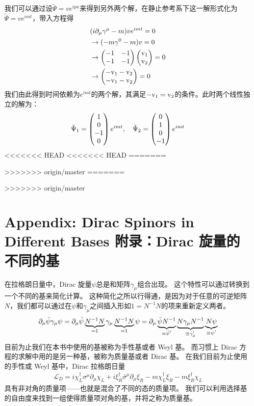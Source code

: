 我们可以通过设$\tilde \Psi =ve^{ipx}$来得到另外两个解，在静止参考系下这一解形式化为$\tilde \Psi=ve^{imt}$，带入方程得
\begin{equation}
\begin{split}
&(i\partial_\mu\gamma^\mu-m)ve^{imt}=0\\
&\to (-m\gamma^0-m)v=0\\
&\to \begin{pmatrix} -1 & -1 \\ -1 & -1 \end{pmatrix} \begin{pmatrix} \rm v_1 \\ \rm v_2 \end{pmatrix} =0\\
&\to \begin{pmatrix} \rm -v_1-v_2 \\ \rm -v_1-v_2 \end{pmatrix} =0
\end{split}
\end{equation}
我们由此得到时间依赖为$e^{imt}$的两个解，其满足$\rm -v_1=v_2$的条件。此时两个线性独立的解为：
\begin{equation}
\tilde \Psi_1=\begin{pmatrix} 1\\0\\-1\\0 \end{pmatrix} e^{imt},~~~\tilde \Psi_2=\begin{pmatrix} 0\\1\\0\\-1 \end{pmatrix} e^{imt}
\end{equation}
<<<<<<< HEAD
<<<<<<< HEAD
=======


>>>>>>> origin/master
=======


>>>>>>> origin/master
\section[附录：Dirac 旋量的不同的基]{Appendix: Dirac Spinors in Different Bases 附录：Dirac 旋量的不同的基}\label{sec8.10}

在拉格朗日量中，Dirac 旋量$\psi$总是和矩阵$\gamma_\mu$组合出现。
这个特性可以通过转换到一个不同的基来简化计算。
这种简化之所以行得通，是因为对于任意的可逆矩阵$N$，我们都可以通过在$\psi$和$\gamma_\mu$之间插入形如$1=N^{-1}N$的项来重新定义两者。
\begin{align}
  \partial_\mu\bar{\psi}\gamma_\mu\psi = \partial_\mu\bar{\psi}\underbrace{N^{-1}N}_{\mathclap{=1}}\gamma_\mu\underbrace{N^{-1}N}_{\mathclap{=1}}\psi = \partial_\mu\underbrace{\bar{\psi}N^{-1}}_{\mathclap{\equiv\bar{\psi}'}}\underbrace{N\gamma_\mu N^{-1}}_{\mathclap{\equiv\gamma'_\mu}}\underbrace{N\psi}_{\mathclap{\equiv\psi'}}
\end{align}
目前为止我们在本书中使用的基被称为手性基或者 Weyl 基。
而习惯上 Dirac 方程的求解中用的是另一种基，被称为质量基或者 Dirac 基。
在我们目前为止使用的手性或 Weyl 基中，Dirac 拉格朗日量
\begin{align}
  \mathcal{L}_D=i\chi_L^\dagger\sigma^\mu\partial_\mu \chi_L+i\xi_R^\dagger\bar{\sigma}^\mu\partial_\mu \xi_R-m\chi_L^\dagger\xi_R-m\xi_R^\dagger\chi_L
\end{align}
具有非对角的质量项——也就是混合了不同的态的质量项。
我们可以利用选择基的自由度来找到一组使得质量项对角的基，并将之称为质量基。

